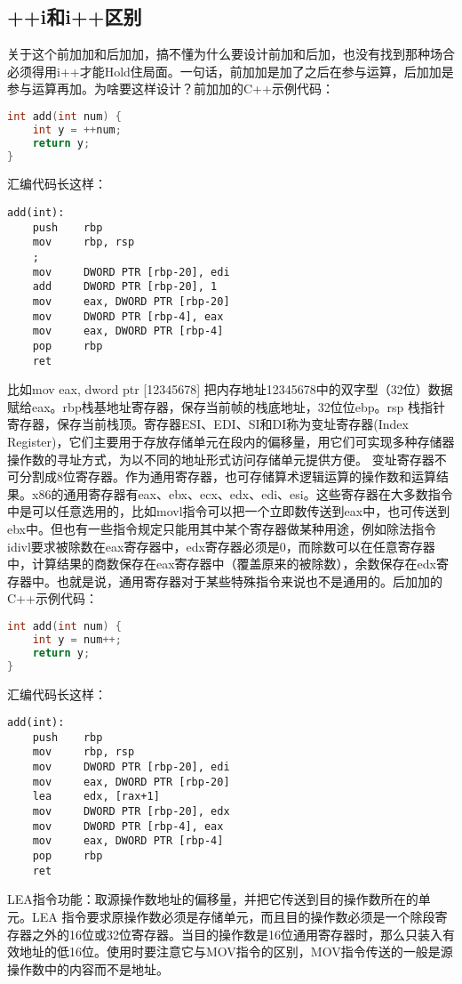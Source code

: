 \documentclass[../../../interview-questions.tex]{subfiles}
\begin{document}
\subsection{++i和i++区别}

关于这个前加加和后加加，搞不懂为什么要设计前加和后加，也没有找到那种场合必须得用i++才能Hold住局面。一句话，前加加是加了之后在参与运算，后加加是参与运算再加。为啥要这样设计？前加加的C++示例代码：

\begin{lstlisting}[language=C++]
int add(int num) {
    int y = ++num;
    return y;
}
\end{lstlisting}

汇编代码长这样：

\begin{lstlisting}[language={[x86masm]Assembler}]
add(int):
    push    rbp
    mov     rbp, rsp
    ; 
    mov     DWORD PTR [rbp-20], edi
    add     DWORD PTR [rbp-20], 1
    mov     eax, DWORD PTR [rbp-20]
    mov     DWORD PTR [rbp-4], eax
    mov     eax, DWORD PTR [rbp-4]
    pop     rbp
    ret
\end{lstlisting}

比如mov eax, dword ptr [12345678]  把内存地址12345678中的双字型（32位）数据赋给eax。rbp栈基地址寄存器，保存当前帧的栈底地址，32位位ebp。rsp 栈指针寄存器，保存当前栈顶。寄存器ESI、EDI、SI和DI称为变址寄存器(Index Register)，它们主要用于存放存储单元在段内的偏移量，用它们可实现多种存储器操作数的寻址方式，为以不同的地址形式访问存储单元提供方便。
变址寄存器不可分割成8位寄存器。作为通用寄存器，也可存储算术逻辑运算的操作数和运算结果。x86的通用寄存器有eax、ebx、ecx、edx、edi、esi。这些寄存器在大多数指令中是可以任意选用的，比如movl指令可以把一个立即数传送到eax中，也可传送到ebx中。但也有一些指令规定只能用其中某个寄存器做某种用途，例如除法指令idivl要求被除数在eax寄存器中，edx寄存器必须是0，而除数可以在任意寄存器中，计算结果的商数保存在eax寄存器中（覆盖原来的被除数），余数保存在edx寄存器中。也就是说，通用寄存器对于某些特殊指令来说也不是通用的。后加加的C++示例代码：

\begin{lstlisting}[language=C++]
int add(int num) {
    int y = num++;
    return y;
}
\end{lstlisting}

汇编代码长这样：

\begin{lstlisting}[language={[x86masm]Assembler}]
add(int):
    push    rbp
    mov     rbp, rsp
    mov     DWORD PTR [rbp-20], edi
    mov     eax, DWORD PTR [rbp-20]
    lea     edx, [rax+1]
    mov     DWORD PTR [rbp-20], edx
    mov     DWORD PTR [rbp-4], eax
    mov     eax, DWORD PTR [rbp-4]
    pop     rbp
    ret
\end{lstlisting}

LEA指令功能：取源操作数地址的偏移量，并把它传送到目的操作数所在的单元。LEA 指令要求原操作数必须是存储单元，而且目的操作数必须是一个除段寄存器之外的16位或32位寄存器。当目的操作数是16位通用寄存器时，那么只装入有效地址的低16位。使用时要注意它与MOV指令的区别，MOV指令传送的一般是源操作数中的内容而不是地址。
\end{document}
